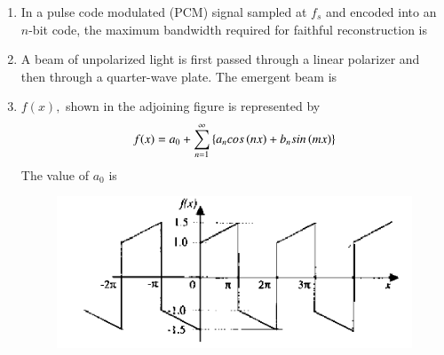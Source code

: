 \documentclass[journal,12pt,onecolumn]{IEEEtran}
\theoremstyle{remark}
\begin{document}
\begin{enumerate}
\hfill{}

\begin{enumerate}
\end{enumerate}

\item In a pulse code modulated (PCM) signal sampled at $f_s$ and encoded into an $n$-bit code, the maximum bandwidth required for faithful reconstruction is

\hfill{}
\begin{enumerate}
\end{enumerate}

\item A beam of unpolarized light is first passed through a linear polarizer and then through a quarter-wave plate. The emergent beam is

\hfill{}
\begin{enumerate}
\end{enumerate}

\item $f(x),$ shown in the adjoining figure is represented by
\[f(x) = a_0 + \sum_{n=1}^{\infty}
\left\{
a_n cos\left(nx\right) + b_n sin\left(mx\right)
\right\}
\]
The value of $a_0$ is
\\
\begin{figure}[H]
    \centering
    \includegraphics[scale=0.75]{q10}
    \caption*{}
    \label{fig:placeholder}
\end{figure}


\end{enumerate}
\end{document}
